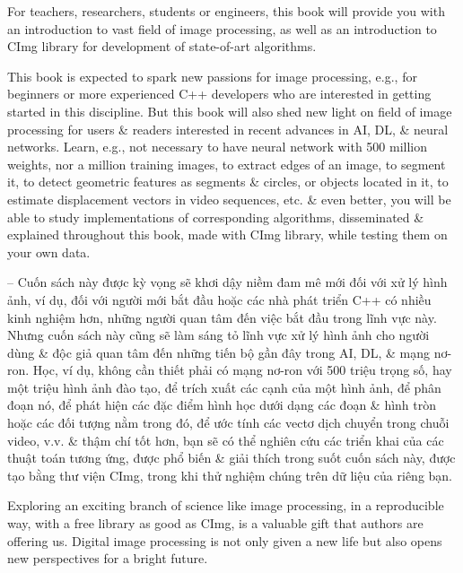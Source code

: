 \documentclass{article}
\begin{document}
\begin{itemize}
    For teachers, researchers, students or engineers, this book will provide you with an introduction to vast field of image processing, as well as an introduction to CImg library for development of state-of-art algorithms.
    
    This book is expected to spark new passions for image processing, e.g., for beginners or more experienced C++ developers who are interested in getting started in this discipline. But this book will also shed new light on field of image processing for users \& readers interested in recent advances in AI, DL, \& neural networks. Learn, e.g., not necessary to have neural network with 500 million weights, nor a million training images, to extract edges of an image, to segment it, to detect geometric features as segments \& circles, or objects located in it, to estimate displacement vectors in video sequences, etc. \& even better, you will be able to study implementations of corresponding algorithms, disseminated \& explained throughout this book, made with CImg library, while testing them on your own data.
    
    -- Cuốn sách này được kỳ vọng sẽ khơi dậy niềm đam mê mới đối với xử lý hình ảnh, ví dụ, đối với người mới bắt đầu hoặc các nhà phát triển C++ có nhiều kinh nghiệm hơn, những người quan tâm đến việc bắt đầu trong lĩnh vực này. Nhưng cuốn sách này cũng sẽ làm sáng tỏ lĩnh vực xử lý hình ảnh cho người dùng \& độc giả quan tâm đến những tiến bộ gần đây trong AI, DL, \& mạng nơ-ron. Học, ví dụ, không cần thiết phải có mạng nơ-ron với 500 triệu trọng số, hay một triệu hình ảnh đào tạo, để trích xuất các cạnh của một hình ảnh, để phân đoạn nó, để phát hiện các đặc điểm hình học dưới dạng các đoạn \& hình tròn hoặc các đối tượng nằm trong đó, để ước tính các vectơ dịch chuyển trong chuỗi video, v.v. \& thậm chí tốt hơn, bạn sẽ có thể nghiên cứu các triển khai của các thuật toán tương ứng, được phổ biến \& giải thích trong suốt cuốn sách này, được tạo bằng thư viện CImg, trong khi thử nghiệm chúng trên dữ liệu của riêng bạn.
    
    Exploring an exciting branch of science like image processing, in a reproducible way, with a free library as good as CImg, is a valuable gift that authors are offering us. Digital image processing is not only given a new life but also opens new perspectives for a bright future.
    

\end{itemize}
\end{document}
